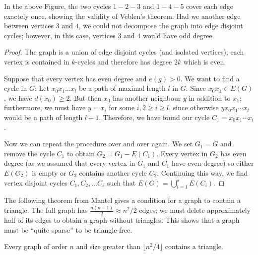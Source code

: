 In the above Figure, the two cycles $1-2-3$ and $1-4-5$ cover each edge exactely once, showing the validity of Veblen's theorem. Had we another edge between vertices $3$ and $4$, we could not decompose the graph into edge disjoint cycles; however, in this case, vertices $3$ and $4$ would have odd degree.

\begin{proof}
  The graph is a union of edge disjoint cycles (and isolated vertices); each vertex is contained in $k$-cycles and therefore has degree $2k$ which is even.

  Suppose that every vertex has even degree and $e(g) > 0$. We want to find a cycle in $G$: Let $x_0 x_1 \ldots x_l$ be a path of maximal length $l$ in $G$. Since $x_0 x_1 \in E(G)$, we have $d(x_0) \geq 2$. But then $x_0$ has another neighbour $y$ in addition to $x_1$; furthermore, we must have $y=x_i$ for some $i, 2 \geq i \geq l$, since otherwise $y x_0 x_1 \cdots x_l$ would be a path of length $l+1$. Therefore, we have found our cycle $C_1 = x_0 x_1 \cdots x_i$.

  Now we can repeat the procedure over and over again. We set $G_1 = G$ and remove the cycle $C_1$ to obtain $G_2 = G_1 - E(C_1)$. Every vertex in $G_2$ has even degree (as we assumed that every vertex in $G_1$ and $C_1$ have even degree) so either $E(G_2)$ is empty or $G_2$ contains another cycle $C_2$. Continuing this way, we find vertex disjoint cycles $C_1, C_2, \ldots C_s$ such that $E(G) = \bigcup_{i=1}^s E(C_i)$.
\end{proof}

The following theorem from Mantel gives a condition for a graph to contain a triangle. The full graph has $\frac{n(n-1)}{2} \approx n^2 / 2$ edges; we must delete approximately half of its edges to obtain a graph without triangles. This shows that a graph must be ``quite sparse'' to be triangle-free.

\begin{theorem}
  Every graph of order $n$ and size greater than $\lfloor n^2/4 \rfloor$ contains a triangle.
\end{theorem}

